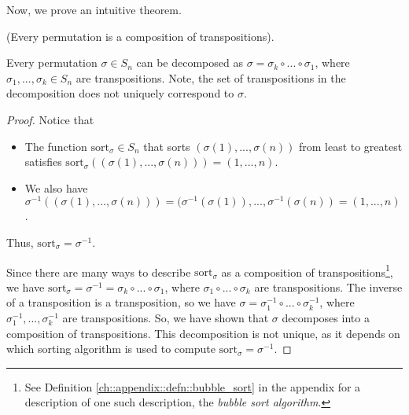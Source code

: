 Now, we prove an intuitive theorem.

\begin{theorem}
\label{ch::lin_alg::thm::permutations_decomposition_into_transpositions}
    (Every permutation is a composition of transpositions).

    Every permutation $\sigma \in S_n$ can be decomposed as $\sigma = \sigma_k \circ ... \circ \sigma_1$, where $\sigma_1, ..., \sigma_k \in S_n$ are transpositions. Note, the set of transpositions in the decomposition does not uniquely correspond to $\sigma$.
\end{theorem}

\begin{proof}  
    Notice that
    
    \begin{itemize}
        \item The function $\text{sort}_\sigma \in S_n$ that sorts $(\sigma(1), ..., \sigma(n))$ from least to greatest satisfies $\text{sort}_\sigma((\sigma(1), ..., \sigma(n))) = (1, ..., n)$.
        \item We also have $\sigma^{-1}((\sigma(1), ..., \sigma(n))) = (\sigma^{-1}(\sigma(1)), ..., \sigma^{-1}(\sigma(n)) = (1, ..., n)$.
    \end{itemize} 
    
    Thus, $\text{sort}_\sigma = \sigma^{-1}$. 
    
    Since there are many ways to describe $\text{sort}_\sigma$ as a composition of transpositions\footnote{See Definition \ref{ch::appendix::defn::bubble_sort} in the appendix for a description of one such description, the \textit{bubble sort algorithm}.}, we have $\text{sort}_\sigma = \sigma^{-1} = \sigma_k \circ ... \circ \sigma_1$, where $\sigma_1 \circ ... \circ \sigma_k$ are transpositions. The inverse of a transposition is a transposition, so we have $\sigma = \sigma_1^{-1} \circ ... \circ \sigma_k^{-1}$, where $\sigma_1^{-1}, ..., \sigma_k^{-1}$ are transpositions. So, we have shown that $\sigma$ decomposes into a composition of transpositions. This decomposition is not unique, as it depends on which sorting algorithm is used to compute $\text{sort}_\sigma = \sigma^{-1}$.
    
\end{proof}

